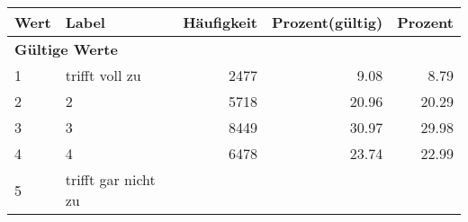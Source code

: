      \begin{longtable}{lXrrr}
     \toprule
     \textbf{Wert} & \textbf{Label} & \textbf{Häufigkeit} & \textbf{Prozent(gültig)} & \textbf{Prozent} \\
     \endhead
     \midrule
     \multicolumn{5}{l}{\textbf{Gültige Werte}}\\

     1 &
     \multicolumn{1}{X}{ trifft voll zu   } &


       \num{2477} &
       \num[round-mode=places,round-precision=2]{9,08} &
         \num[round-mode=places,round-precision=2]{8,79} \\

     2 &
     \multicolumn{1}{X}{ 2   } &


       \num{5718} &
       \num[round-mode=places,round-precision=2]{20,96} &
         \num[round-mode=places,round-precision=2]{20,29} \\

     3 &
     \multicolumn{1}{X}{ 3   } &


       \num{8449} &
       \num[round-mode=places,round-precision=2]{30,97} &
         \num[round-mode=places,round-precision=2]{29,98} \\

     4 &
     \multicolumn{1}{X}{ 4   } &


       \num{6478} &
       \num[round-mode=places,round-precision=2]{23,74} &
         \num[round-mode=places,round-precision=2]{22,99} \\

     5 &
     \multicolumn{1}{X}{ trifft gar nicht zu   } &



\end{longtable}
